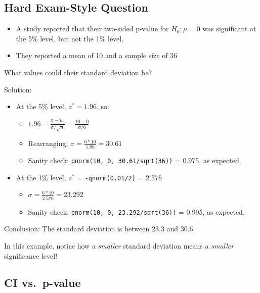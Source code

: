 \documentclass[
  letterpaper,
  DIV=11,
  numbers=noendperiod,
  oneside]{scrreprt}
\providecommand{\tightlist}{%
  \setlength{\itemsep}{0pt}\setlength{\parskip}{0pt}}\usepackage{longtable,booktabs,array}
\begin{document}
\hypertarget{hard-exam-style-question}{%
\subsection{Hard Exam-Style Question}\label{hard-exam-style-question}}

\begin{itemize}
\tightlist
\item
  A study reported that their two-sided p-value for \(H_0:\mu = 0\) was
  significant at the 5\% level, but not the 1\% level.
\item
  They reported a mean of 10 and a sample size of 36
\end{itemize}

What values could their standard deviation be?

Solution:

\begin{itemize}
\tightlist
\item
  At the 5\% level, \(z^* = 1.96\), so:

  \begin{itemize}
  \tightlist
  \item
    \(1.96 = \frac{x - \mu_0}{\sigma/\sqrt{n}} = \frac{10 - 0}{\sigma/6}\)
  \item
    Rearranging, \(\sigma= \frac{6*10}{1.96} = 30.61\)
  \item
    Sanity check: \texttt{pnorm(10,\ 0,\ 30.61/sqrt(36))} = 0.975, as
    expected.
  \end{itemize}
\item
  At the 1\% level, \(z^*\) = \texttt{-qnorm(0.01/2)} = 2.576

  \begin{itemize}
  \tightlist
  \item
    \(\sigma= \frac{6*10}{2.576} = 23.292\)
  \item
    Sanity check: \texttt{pnorm(10,\ 0,\ 23.292/sqrt(36))} = 0.995, as
    expected.
  \end{itemize}
\end{itemize}

Conclusion: The standard deviation is between 23.3 and 30.6.

In this example, notice how a \emph{smaller} standard deviation means a
\emph{smaller} significance level!

\hypertarget{ci-vs.-p-value}{%
\subsection{CI vs.~p-value}\label{ci-vs.-p-value}}
\end{document}
